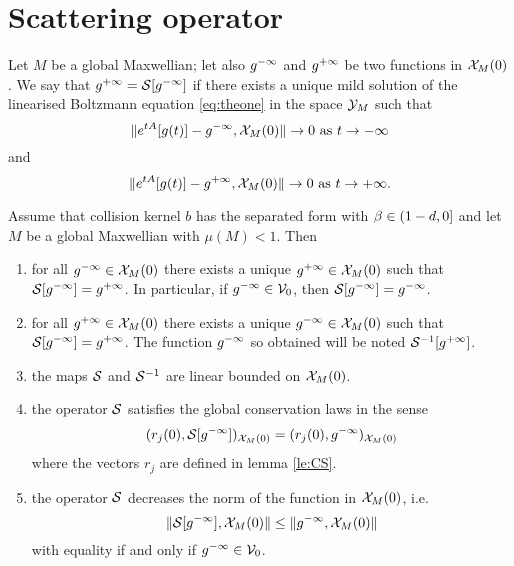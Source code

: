 \section{Scattering operator} %
\label{sec:scattering_operator}
\begin{definition}\label{def:sc}
	Let $M$ be a global Maxwellian; let also ${g^{-\infty}}$ and ${g^{+\infty}}$ be two functions in ${\mathcal X_M(0)}$. We say that ${g^{+\infty}}=\mathcal S[{g^{-\infty}}]$ if there exists a unique mild solution of the linearised Boltzmann equation \eqref{eq:theone} in the space ${\mathcal Y_M}$ such that
	\[\|e^{tA}[g(t)]-{g^{-\infty}},{\mathcal X_M(0)}\|\to 0\mbox{ as }t\to -\infty\]
	and
	\[\|e^{tA}[g(t)]-{g^{+\infty}},{\mathcal X_M(0)}\|\to 0\mbox{ as }t\to +\infty.\]
\end{definition}
 
\begin{theorem}
	\label{th:sc}
	Assume that collision kernel $b$ has the separated form with $\beta\in ( 1-d ,0]$ and let $M$ be a global Maxwellian with $\mu(M)<1$. Then
	\begin{enumerate}
		\item for all ${g^{-\infty}}\in{\mathcal X_M(0)}$ there exists a unique ${g^{+\infty}}\in{\mathcal X_M(0)}$ such that $\mathcal S[{g^{-\infty}}]={g^{+\infty}}$. In particular, if ${g^{-\infty}}\in {\mathcal V_0}$, then $\mathcal S[{g^{-\infty}}]={g^{-\infty}}$.
		\item  for all ${g^{+\infty}}\in{\mathcal X_M(0)}$ there exists a unique ${g^{-\infty}}\in{\mathcal X_M(0)}$ such that $\mathcal S[{g^{-\infty}}]={g^{+\infty}}$. The function ${g^{-\infty}}$ so obtained will be noted $\mathcal S^{-1}[{g^{+\infty}}]$.
		\item the maps $\mathcal S$ and $\mathcal S^{-1}$ are linear bounded on ${\mathcal X_M(0)}$.
		\item the operator $\mathcal S$ satisfies the global conservation laws in the sense
		\[
		(r_j(0),\mathcal S[{g^{-\infty}}])_{{\mathcal X_M(0)}}
		=(r_j(0), {g^{-\infty}} )_{{\mathcal X_M(0)}}
		\]
		where the vectors $r_j$ are defined in lemma \ref{le:CS}.
		\item the operator $\mathcal S$ decreases the norm of the function in ${\mathcal X_M(0)}$, i.e.
		\[\|\mathcal S[{g^{-\infty}}],{\mathcal X_M(0)}\|\le \|{g^{-\infty}},{\mathcal X_M(0)}\|\]
		with equality if and only if ${g^{-\infty}}\in {\mathcal V_0}$.
 	\end{enumerate}
\end{theorem}

